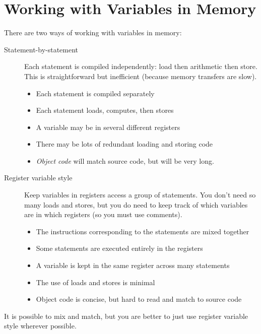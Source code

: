 \section{Working with Variables in Memory}\label{sec:working_with_variables_in_memory}

There are two ways of working with variables in memory:
\begin{description}
    \item[Statement-by-statement] Each statement is compiled independently: load then arithmetic then store. This is straightforward but inefficient (because memory transfers are slow).
        \begin{itemize}
            \item Each statement is compiled separately
            \item Each statement loads, computes, then stores
            \item A variable may be in several different registers
            \item There may be lots of redundant loading and storing code
            \item \emph{Object code} will match source code, but will be very long.
        \end{itemize}
    \item[Register variable style] Keep variables in registers access a group of statements. You don't need so many loads and stores, but you do need to keep track of which variables are in which registers (so you must use comments).
        \begin{itemize}
            \item The instructions corresponding to the statements are mixed together
            \item Some statements are executed entirely in the registers
            \item A variable is kept in the same register across many statements
            \item The use of loads and stores is minimal
            \item Object code is concise, but hard to read and match to source code
        \end{itemize}
\end{description}

\begin{note}
    It is possible to mix and match, but you are better to just use register variable style wherever possible.
\end{note}

